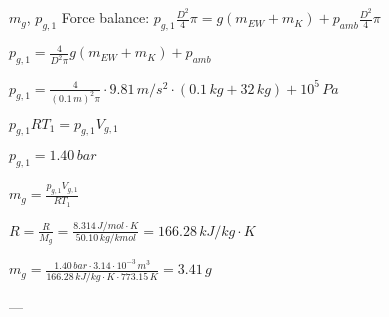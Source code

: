\( m_g \), \( p_{g,1} \)  
Force balance:  
\( p_{g,1} \frac{D^2}{4} \pi = g (m_{EW} + m_K) + p_{amb} \frac{D^2}{4} \pi \)  

\( p_{g,1} = \frac{4}{D^2 \pi} g (m_{EW} + m_K) + p_{amb} \)  

\( p_{g,1} = \frac{4}{(0.1 \, m)^2 \pi} \cdot 9.81 \, m/s^2 \cdot (0.1 \, kg + 32 \, kg) + 10^5 \, Pa \)  

\( p_{g,1} R T_1 = p_{g,1} V_{g,1} \)  

\( p_{g,1} = 1.40 \, bar \)  

\( m_g = \frac{p_{g,1} V_{g,1}}{R T_1} \)  

\( R = \frac{R}{M_g} = \frac{8.314 \, J/mol \cdot K}{50.10 \, kg/kmol} = 166.28 \, kJ/kg \cdot K \)  

\( m_g = \frac{1.40 \, bar \cdot 3.14 \cdot 10^{-3} \, m^3}{166.28 \, kJ/kg \cdot K \cdot 773.15 \, K} = 3.41 \, g \)  

---